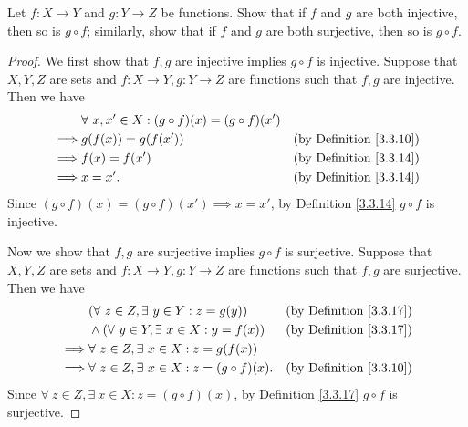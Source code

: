 \begin{exercise}\label{ex 3.3.2}
    Let \(f : X \to Y\) and \(g : Y \to Z\) be functions.
    Show that if \(f\) and \(g\) are both injective, then so is \(g \circ f\);
    similarly, show that if \(f\) and \(g\) are both surjective, then so is \(g \circ f\).
\end{exercise}

\begin{proof}
    We first show that \(f, g\) are injective implies \(g \circ f\) is injective.
    Suppose that \(X, Y, Z\) are sets and \(f : X \to Y, g : Y \to Z\) are functions such that \(f, g\) are injective.
    Then we have
    \begin{align*}
                 & \forall\ x, x' \in X : (g \circ f)(x) = (g \circ f)(x')                                       \\
        \implies & g(f(x)) = g(f(x'))                                      & \text{(by Definition \ref{3.3.10})} \\
        \implies & f(x) = f(x')                                            & \text{(by Definition \ref{3.3.14})} \\
        \implies & x = x'.                                                 & \text{(by Definition \ref{3.3.14})}
    \end{align*}
    Since \((g \circ f)(x) = (g \circ f)(x') \implies x = x'\), by Definition \ref{3.3.14} \(g \circ f\) is injective.

    Now we show that \(f, g\) are surjective implies \(g \circ f\) is surjective.
    Suppose that \(X, Y, Z\) are sets and \(f : X \to Y, g : Y \to Z\) are functions such that \(f, g\) are surjective.
    Then we have
    \begin{align*}
                 & (\forall\ z \in Z, \exists\ y \in Y : z = g(y))          & \text{(by Definition \ref{3.3.17})} \\
                 & \land (\forall\ y \in Y, \exists\ x \in X : y = f(x))    & \text{(by Definition \ref{3.3.17})} \\
        \implies & \forall\ z \in Z, \exists\ x \in X : z = g(f(x))                                               \\
        \implies & \forall\ z \in Z, \exists\ x \in X : z = (g \circ f)(x). & \text{(by Definition \ref{3.3.10})}
    \end{align*}
    Since \(\forall\ z \in Z, \exists\ x \in X : z = (g \circ f)(x)\), by Definition \ref{3.3.17} \(g \circ f\) is surjective.
\end{proof}

